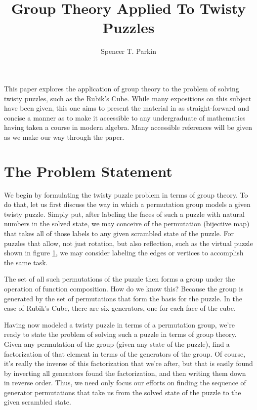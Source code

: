 \documentclass[12pt]{article}
\title{Group Theory Applied To Twisty Puzzles}
\author{Spencer T. Parkin}
\begin{document}
\maketitle

This paper explores the application of group theory to the problem of solving twisty puzzles,
such as the Rubik's Cube.  While many expositions on this subject have been given, this one
aims to present the material in as straight-forward and concise a manner as to make it
accessible to any undergraduate of mathematics having taken a course in
modern algebra.  Many accessible references will be given as
we make our way through the paper.

\section{The Problem Statement}

We begin by formulating the twisty puzzle problem in terms of group theory.  To do that, let us
first discuss the way in which a permutation group models a given twisty puzzle.  Simply put,
after labeling the faces of such a puzzle with natural numbers in the solved state, we may
conceive of the permutation (bijective map) that takes all of those labels to any given scrambled
state of the puzzle.  For puzzles that allow, not just rotation, but also reflection, such as
the virtual puzzle shown in figure \ref{}, we may consider labeling the edges or vertices
to accomplish the same task.

The set of all such permutations of the puzzle then forms a group under the operation of
function composition.  How do we know this?  Because the group is generated by the
set of permutations that form the basis for the puzzle.  In the case of Rubik's Cube,
there are six generators, one for each face of the cube.

Having now modeled a twisty puzzle in terms of a permutation group, we're ready
to state the problem of solving such a puzzle in terms of group theory.  Given any
permutation of the group (given any state of the puzzle), find a factorization of
that element in terms of the generators of the group.  Of course, it's really the
inverse of this factorization that we're after, but that is easily found by inverting all
generators found the factorization, and then writing them down in reverse order.
Thus, we need only focus our efforts on finding the sequence of generator permutations
that take us from the solved state of the puzzle to the given scrambled state.
\end{document}
